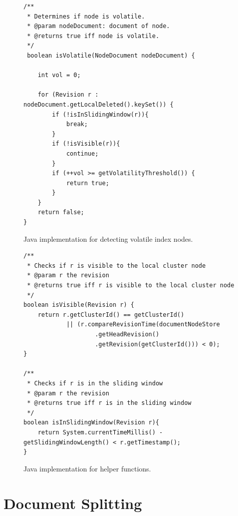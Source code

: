 \documentclass[abstracton,12pt]{scrreprt}
\begin{document}
\begin{figure}[h]
    \begin{framed}
        \begin{scriptsize}
            \begin{verbatim}
/**
 * Determines if node is volatile.
 * @param nodeDocument: document of node.
 * @returns true iff node is volatile.
 */            
 boolean isVolatile(NodeDocument nodeDocument) {

    int vol = 0;
    
    for (Revision r : nodeDocument.getLocalDeleted().keySet()) {
        if (!isInSlidingWindow(r)){
            break;
        }
        if (!isVisible(r)){
            continue;
        }
        if (++vol >= getVolatilityThreshold()) {
            return true;
        }
    }
    return false;
}
            \end{verbatim}
        \end{scriptsize}
    \end{framed}
    \caption{Java implementation for detecting volatile index nodes.}
    \label{algo:is_volatile}
\end{figure}

\begin{figure}[h]
    \begin{framed}
        \begin{scriptsize}
            \begin{verbatim}
/**
 * Checks if r is visible to the local cluster node
 * @param r the revision
 * @returns true iff r is visible to the local cluster node
 */
boolean isVisible(Revision r) {
    return r.getClusterId() == getClusterId()
            || (r.compareRevisionTime(documentNodeStore
                    .getHeadRevision()
                    .getRevision(getClusterId())) < 0);
}

/**
 * Checks if r is in the sliding window
 * @param r the revision
 * @returns true iff r is in the sliding window
 */
boolean isInSlidingWindow(Revision r){
    return System.currentTimeMillis() - getSlidingWindowLength() < r.getTimestamp();
}
            \end{verbatim}
        \end{scriptsize}
    \end{framed}
    \caption{Java implementation for helper functions.}
    \label{algo:helper_functions}
\end{figure}

\section{Document Splitting}
\end{document}
